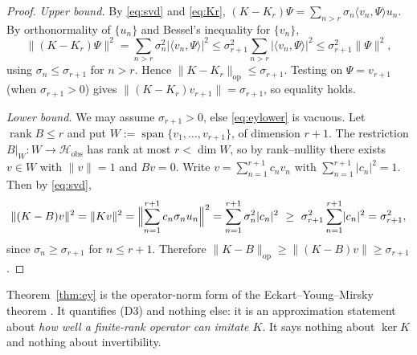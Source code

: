 \documentclass[11pt,reqno]{amsart}
\numberwithin{equation}{section}
\theoremstyle{plain}
\theoremstyle{definition}
\theoremstyle{remark}
\newcommand{\Hobs}{\mathcal{H}_{\mathrm{obs}}}
\newcommand{\inner}[2]{\langle #1 , #2 \rangle}
\DeclareMathOperator{\Rank}{rank}
\DeclareMathOperator{\spanset}{span}
\begin{document}
\begin{proof}
\emph{Upper bound.} By \eqref{eq:svd} and \eqref{eq:Kr},
$(K-K_{r})\Psi=\sum_{n>r}\sigma_{n}\inner{v_{n}}{\Psi}u_{n}$. By orthonormality of
$\{u_{n}\}$ and Bessel's inequality for $\{v_{n}\}$,
\[
\lVert(K-K_{r})\Psi\rVert^{2}=\sum_{n>r}\sigma_{n}^{2}\lvert\inner{v_{n}}{\Psi}\rvert^{2}
\le\sigma_{r+1}^{2}\sum_{n>r}\lvert\inner{v_{n}}{\Psi}\rvert^{2}
\le\sigma_{r+1}^{2}\lVert\Psi\rVert^{2},
\]
using $\sigma_{n}\le\sigma_{r+1}$ for $n>r$. Hence
$\lVert K-K_{r}\rVert_{\mathrm{op}}\le\sigma_{r+1}$. Testing on $\Psi=v_{r+1}$ (when
$\sigma_{r+1}>0$) gives $\lVert(K-K_{r})v_{r+1}\rVert=\sigma_{r+1}$, so equality holds.

\emph{Lower bound.} We may assume $\sigma_{r+1}>0$, else \eqref{eq:eylower} is vacuous. Let
$\Rank B\le r$ and put $W:=\spanset\{v_{1},\dots,v_{r+1}\}$, of dimension $r+1$. The
restriction $B|_{W}:W\to\Hobs$ has rank at most $r<\dim W$, so by rank--nullity there exists
$v\in W$ with $\lVert v\rVert=1$ and $Bv=0$. Write $v=\sum_{n=1}^{r+1}c_{n}v_{n}$ with
$\sum_{n=1}^{r+1}\lvert c_{n}\rvert^{2}=1$. Then by \eqref{eq:svd},
\[
\lVert(K-B)v\rVert^{2}=\lVert Kv\rVert^{2}
=\Bigl\lVert\sum_{n=1}^{r+1}c_{n}\sigma_{n}u_{n}\Bigr\rVert^{2}
=\sum_{n=1}^{r+1}\sigma_{n}^{2}\lvert c_{n}\rvert^{2}
\ \ge\ \sigma_{r+1}^{2}\sum_{n=1}^{r+1}\lvert c_{n}\rvert^{2}
=\sigma_{r+1}^{2},
\]
since $\sigma_{n}\ge\sigma_{r+1}$ for $n\le r+1$. Therefore
$\lVert K-B\rVert_{\mathrm{op}}\ge\lVert(K-B)v\rVert\ge\sigma_{r+1}$.
\end{proof}

Theorem~\ref{thm:ey} is the operator-norm form of the Eckart--Young--Mirsky theorem
\cite{Schmidt,EckartYoung,Mirsky}. It quantifies (D3) and nothing else: it is an
approximation statement about \emph{how well a finite-rank operator can imitate $K$}. It
says nothing about $\ker K$ and nothing about invertibility.
\end{document}
